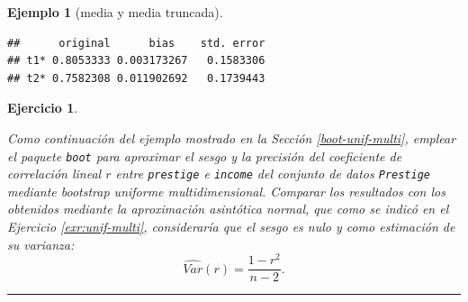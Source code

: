 \documentclass[
]{book}
\newenvironment{Shaded}{\begin{snugshade}}{\end{snugshade}}
\newcommand{\AttributeTok}[1]{\textcolor[rgb]{0.77,0.63,0.00}{#1}}
\newcommand{\ConstantTok}[1]{\textcolor[rgb]{0.00,0.00,0.00}{#1}}
\newcommand{\DecValTok}[1]{\textcolor[rgb]{0.00,0.00,0.81}{#1}}
\newcommand{\FunctionTok}[1]{\textcolor[rgb]{0.00,0.00,0.00}{#1}}
\newcommand{\NormalTok}[1]{#1}
\newcommand{\OtherTok}[1]{\textcolor[rgb]{0.56,0.35,0.01}{#1}}
\newcommand{\SpecialCharTok}[1]{\textcolor[rgb]{0.00,0.00,0.00}{#1}}
\newcommand{\StringTok}[1]{\textcolor[rgb]{0.31,0.60,0.02}{#1}}
\theoremstyle{break}
\newtheorem{exercise}{Ejercicio}[chapter]
\newtheorem{example}{Ejemplo}[chapter]
\theoremstyle{nonumberplain}
\begin{document}
\begin{example}[media y media truncada]
\begin{Shaded}
\end{Shaded}

\begin{verbatim}
##      original      bias    std. error
## t1* 0.8053333 0.003173267   0.1583306
## t2* 0.7582308 0.011902692   0.1739443
\end{verbatim}

\end{example}

\begin{exercise}
\protect\hypertarget{exr:unif-multi-sesgo-var}{}\label{exr:unif-multi-sesgo-var}

Como continuación del ejemplo mostrado en la Sección \ref{boot-unif-multi}, emplear el paquete \texttt{boot} para aproximar el sesgo y la precisión del coeficiente de correlación lineal \(r\) entre \texttt{prestige} e \texttt{income} del conjunto de datos \texttt{Prestige} mediante bootstrap uniforme multidimensional.
Comparar los resultados con los obtenidos mediante la aproximación asintótica normal, que como se indicó en el Ejercicio \ref{exr:unif-multi}, consideraría que el sesgo es nulo y como estimación de su varianza:
\[\widehat{Var}(r) = \frac{1 - r^2}{n - 2}.\]
\end{exercise}

\begin{center}\rule{0.5\linewidth}{0.5pt}\end{center}
\end{document}

